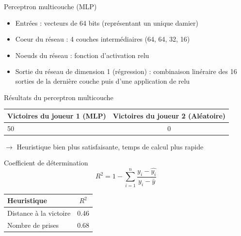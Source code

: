 \documentclass{beamer}
\begin{document}
\begin{frame}{Perceptron multicouche (MLP)}
    \begin{itemize}
        \item Entrées : vecteurs de 64 bits (représentant un unique damier)
        \item Coeur du réseau : 4 couches intermédiaires (64, 64, 32, 16)
        \item Noeuds du réseau : fonction d'activation \alert{relu}
        \item Sortie du réseau de dimension 1 (régression) : combinaison linéraire des 16 sorties de la dernière couche puis d'une application de \alert{relu}
    \end{itemize}
\end{frame}

\begin{frame}{Résultats du perceptron multicouche}
    \begin{center}
        \begin{tabular}{ | l | c | }
            \hline
            Victoires du joueur 1 (MLP) & Victoires du joueur 2 (Aléatoire) \\ \hline
            50                          & 0                                 \\ \hline
        \end{tabular}
    \end{center}
    $\rightarrow$ Heuristique bien plus satisfaisante, temps de calcul plus rapide
\end{frame}

\begin{frame}{Coefficient de détermination}
    $$R^2 = 1 - \sum_{i=1}^{n} \frac{y_i - \hat{y_i}}{y_i - \bar{y}}$$
    \begin{center}
        \begin{tabular}{ | l | c | }
            \hline
            Heuristique & $R^2$ \\ \hline
            Distance à la victoire & 0.46 \\ \hline
            Nombre de prises & 0.68 \\ \hline
        \end{tabular}
    \end{center}
\end{frame}
\end{document}

